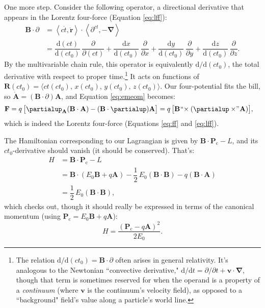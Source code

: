 \documentclass[12pt]{article}
\renewcommand{\vv}[1]{\mathbf{#1}}
\newcommand{\dd}[1]{\mathrm{d}#1}
\newcommand{\del}{\boldsymbol{\nabla}}
\begin{document}
One more step. Consider the following operator, a directional derivative that appears in the Lorentz four-force (Equation \ref{eq:lff}):
\begin{equation*}
\begin{split}
\vv B \cdot \partialup &= \left \langle c \mathring{t}, \mathring{\vv r} \right \rangle \cdot \left \langle \partial^{ct}, - \del \right \rangle \\[4pt]
&= \dfrac{\dd (ct)}{\dd (ct_0)} \, \dfrac{\partial}{\partial (ct)} + \dfrac{\dd x}{\dd (ct_0)} \, \dfrac{\partial}{\partial x} +  \dfrac{\dd y}{\dd (ct_0)} \, \dfrac{\partial}{\partial y} + \dfrac{\dd z}{\dd (ct_0)} \, \dfrac{\partial}{\partial z} .
\end{split}
\end{equation*}
By the multivariable chain rule, this operator is equivalently $\dd / \dd (ct_0)$, the total derivative with respect to proper time.\footnote{The relation $\dd / \dd (ct_0) = \vv B \cdot \partialup$ often arises in general relativity. It's analogous to the Newtonian ``convective derivative," ${\dd / \dd t = \partial / \partial t + \vv v \cdot \del}$, though that term is sometimes reserved for when the operand is a property of a \emph{continuum} (where $\vv v$ is the continuum's velocity field), as opposed to a ``background" field's value along a particle's world line.} It acts on functions of ${\vv R (ct_0) = \langle ct (ct_0), \, x (ct_0), \, y (ct_0), \, z (ct_0) \rangle}$. Our four-potential fits the bill, so $\mathring{\vv A} = (\vv B \cdot \partialup) \vv A $, and Equation \ref{eq:emeom} becomes:
\begin{equation*}
\begin{split}
\vv F &= q \, \bigl[ \partialup_{\vv A} (\vv B \cdot \vv A) - (\vv B \cdot \partialup) \vv A \bigr] = q \, \bigl[ \vv B \mkern1mu `` \mkern-4mu \times (\partialup \times \mkern-4mu " \mkern1mu \vv A) \bigr] ,
\end{split}
\end{equation*}
which is indeed the Lorentz four-force (Equations \ref{eq:ff} and \ref{eq:lff}).

The Hamiltonian corresponding to our Lagrangian is given by $ \vv B \cdot \vv P _\mathrm{c} - L $, and its $ct_0$-derivative should vanish (it should be conserved). That's:
\begin{equation*}
\begin{split}
H &= \vv B \cdot \vv P_\mathrm{c} - L \\
&= \vv B \cdot \left( E_0 \vv B + q \vv A \right) - \dfrac{1}{2} \, E_0 (\vv B \cdot \vv B) - q (\vv B \cdot \vv A) \\
&= \dfrac{1}{2} \, E_0 (\vv B \cdot \vv B) ,
\end{split}
\end{equation*}
which checks out, though it should really be expressed in terms of the canonical momentum (using $\vv P_\mathrm{c} = E_0 \vv B + q \vv A $):
\begin{equation*}
H = \dfrac{\left( \vv P_\mathrm{c} - q \vv A \right) ^2}{2 E_0} .
\end{equation*}
\end{document}
